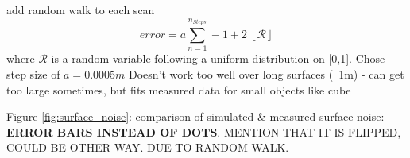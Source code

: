 		add random walk to each scan
		\begin{equation}
			error = a\sum_{n = 1}^{n_{Steps}}-1 + 2\:\left \lfloor{\mathcal{R}}\right \rfloor 
		\end{equation} 
		where $\mathcal{R}$ is a random variable following a uniform distribution on [0,1]. Chose step size of $a = 0.0005m$
		Doesn't work too well over long surfaces (~1m) - can get too large sometimes, but fits measured data for small objects like cube
		
		Figure \ref{fig:surface_noise}: comparison of simulated \& measured surface noise:
		\textbf{ERROR BARS INSTEAD OF DOTS}. MENTION THAT IT IS FLIPPED, COULD BE OTHER WAY. DUE TO RANDOM WALK.
		\begin{figure}
	  		\centering
\end{figure}

